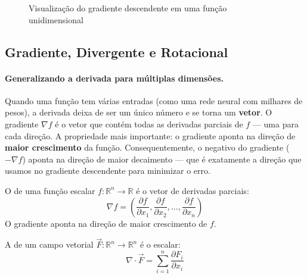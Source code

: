 \begin{figure}[htb]
    \centering
    \caption{Visualização do gradiente descendente em uma função
             unidimensional}
    \label{fig:gradiente-descendente}
\end{figure}

\subsection{Gradiente, Divergente e Rotacional}

\paragraph{Generalizando a derivada para múltiplas dimensões.} Quando uma
função tem várias entradas (como uma rede neural com milhares de pesos),
a derivada deixa de ser um único número e se torna um \textbf{vetor}.
O gradiente $\nabla f$ é o vetor que contém todas as derivadas parciais de
$f$ --- uma para cada direção. A propriedade mais importante: o gradiente
aponta na direção de \textbf{maior crescimento} da função. Consequentemente,
o negativo do gradiente ($-\nabla f$) aponta na direção de maior
decaimento --- que é exatamente a direção que usamos no gradiente
descendente para minimizar o erro.

\begin{definicao}[Gradiente]
    O  de uma função escalar $f: \mathbb{R}^n \to
    \mathbb{R}$ é o vetor de derivadas parciais:
    \[
    \nabla f = \left( \frac{\partial f}{\partial x_1},
    \frac{\partial f}{\partial x_2}, \ldots,
    \frac{\partial f}{\partial x_n} \right)
    \]
    O gradiente aponta na direção de maior crescimento de $f$.
\end{definicao}

\begin{definicao}[Divergente]
    A  de um campo vetorial $\vec{F}: \mathbb{R}^n \to
    \mathbb{R}^n$ é o escalar:
    \[
    \nabla \cdot \vec{F} = \sum_{i=1}^{n} \frac{\partial F_i}{\partial x_i}
    \]
\end{definicao}

